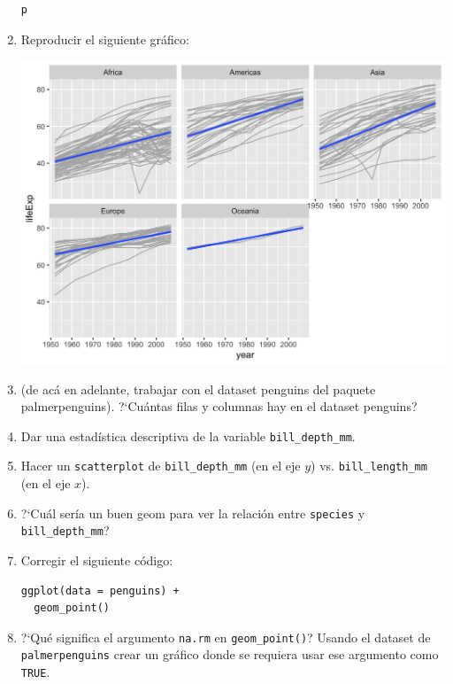 \documentclass[a4paper,11pt]{article}
\theoremstyle{definition}
\begin{document}
\begin{enumerate}[resume]
\begin{lstlisting}
p
\end{lstlisting}

\item Reproducir el siguiente gr\'afico:

\begin{center}
\includegraphics[scale=0.3]{practica2-img-gapminder-lifeExp.png}
\end{center}

\item (de ac\'a en adelante, trabajar con el dataset penguins del paquete palmerpenguins). ?`Cu\'antas filas y columnas hay en el dataset penguins?

\item  Dar una estad\'istica descriptiva de la variable \lstinline{bill_depth_mm}.

\item Hacer un \lstinline{scatterplot} de \lstinline{bill_depth_mm} (en el eje $y$) vs. \lstinline{bill_length_mm} (en el eje $x$).

\item ?`Cu\'al ser\'ia un buen geom para ver la relaci\'on entre \lstinline{species} y \lstinline{bill_depth_mm}?

\item Corregir el siguiente c\'odigo:
\begin{lstlisting}
ggplot(data = penguins) +
  geom_point()
\end{lstlisting}

\item ?`Qu\'e significa el argumento \lstinline{na.rm} en \lstinline{geom_point()}? Usando el dataset de \lstinline{palmerpenguins} crear un gr\'afico donde se requiera usar ese argumento como \lstinline{TRUE}.


\end{enumerate}
\end{document}
